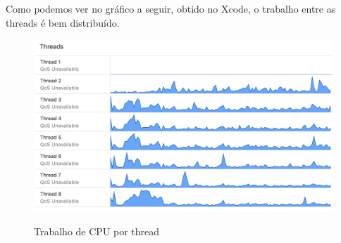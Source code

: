 \documentclass[11pt]{article}
\begin{document}
Como podemos ver no gráfico a seguir, obtido no Xcode, o trabalho entre
as threads é bem distribuído.

\begin{figure}[!htb]
    {\includegraphics[width=\textwidth]
    {thread-work.png}}
    \caption{\label{fig:thread-work} Trabalho de CPU por thread}
\end{figure}
\end{document}
